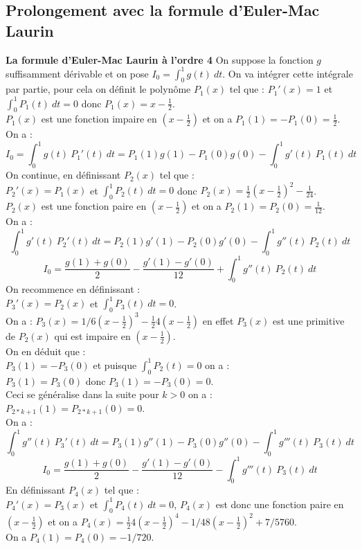 \documentclass[a4paper,11pt]{book}
\begin{document}
\subsection{Prolongement avec la formule d'Euler-Mac Laurin}
{\bf La formule d'Euler-Mac Laurin \`a l'ordre 4}
On suppose la fonction $g$ suffisamment d\'erivable et on pose
$I_0=\int_0^1 g(t)\ dt$.
On va int\'egrer cette int\'egrale par partie, pour cela on d\'efinit le polyn\^ome $P_1(x)$ tel que :
$P_1'(x)=1$ et $\int_0^1 P_1(t)\ dt=0$ donc $P_1(x)=x-\frac{1}{2}$. \\ 
$P_1(x)$ est une fonction impaire en $(x-\frac{1}{2})$ et on a  $P_1(1)=-P_1(0)=\frac{1}{2}$.\\
On a :
$$I_0=\int_0^1 g(t)\ P_1'(t)\ dt=P_1(1)g(1)-P_1(0)g(0)-\int_0^1 g'(t)\ P_1(t)\ dt$$ 
On continue, en d\'efinissant $P_2(x)$ tel que :\\
$P_2'(x)=P_1(x)$ et $\int_0^1 P_2(t)\ dt=0$ donc  $P_2(x)=\frac{1}{2}(x-\frac{1}{2})^2-\frac{1}{24}$.\\ 
$P_2(x)$ est une fonction paire en $(x-\frac{1}{2})$ et on a $P_2(1)=P_2(0)=\frac{1}{12}$.\\
On a :
$$\int_0^1 g'(t)\ P_2'(t)\ dt=P_2(1)g'(1)-P_2(0)g'(0)-\int_0^1 g''(t)\ P_2(t)\ dt$$ 
$$I_0=\frac{g(1)+g(0)}{2}-\frac{g'(1)-g'(0)}{12}+\int_0^1 g''(t)\ P_2(t)\ dt$$
On recommence en d\'efinissant :\\
 $P_3'(x)=P_2(x)$ et $\int_0^1 P_3(t)\ dt=0$.\\ 
On a :
$P_3(x)=1/6(x-\frac{1}{2})^3-\frac{1}{2}4(x-\frac{1}{2})$ en effet $P_3(x)$ est une primitive de 
$P_2(x)$ qui est impaire en $(x-\frac{1}{2})$.\\
On en d\'eduit que :\\ 
 $P_3(1)=-P_3(0)$ et puisque $\int_0^1P_2(t)=0$ on a :\\
 $P_3(1)=P_3(0)$ donc $P_3(1)=-P_3(0)=0$.\\
Ceci se g\'en\'eralise dans la suite pour $k>0$ on a :\\
$P_{2*k+1}(1)=P_{2*k+1}(0)=0$.\\
On a :
$$\int_0^1 g''(t)\ P_3'(t)\ dt=P_3(1)g''(1)-P_3(0)g''(0)-\int_0^1 g'''(t)\ P_3(t)\ dt$$ 
$$I_0=\frac{g(1)+g(0)}{2}-\frac{g'(1)-g'(0)}{12}-\int_0^1 g'''(t)\ P_3(t)\ dt$$
En d\'efinissant $P_4(x)$ tel que :\\
$P_4'(x)=P_3(x)$ et $\int_0^1 P_4(t)\ dt=0$,  $P_4(x)$ est donc une fonction paire en $(x-\frac{1}{2})$ et on a 
$P_4(x)=\frac{1}{2}4(x-\frac{1}{2})^4-1/48(x-\frac{1}{2})^2+7/5760$.\\
On a $P_4(1)=P_4(0)=-1/720$.\\
\end{document}
